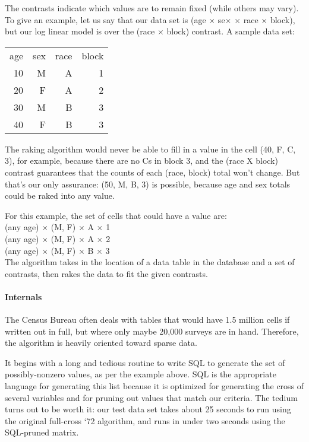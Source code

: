 \documentclass{article}
\begin{document}
The contrasts indicate which values are to remain fixed (while others may vary).
To give an example,
let us say that our data set is (age $\times$ se$\times$ $\times$ race $\times$ block), but
our log linear model is over the (race $\times$ block) contrast. A sample data set:

\begin{tabular}{rrrr}
age &sex &race &block\\
10  &M   &A    &1\\
20  &F   &A    &2\\
30  &M   &B    &3\\
40  &F   &B    &3
\end{tabular}

The raking algorithm would never be able to fill in a value in the cell (40, F, C, 3), for example, because
there are no Cs in block 3, and the (race X block) contrast guarantees that the counts of
each (race, block) total won't change. But that's our only assurance: (50, M, B, 3) is
possible, because age and sex totals could be raked into any value.

For this example, the set of cells that could have a value are:\\
(any age) $\times$ (M, F) $\times$ A $\times$ 1\\
(any age) $\times$ (M, F) $\times$ A $\times$ 2\\
(any age) $\times$ (M, F) $\times$ B $\times$ 3\\

The algorithm takes in the location of a data table in the database and a set of
contrasts, then rakes the data to fit the given contrasts.

\paragraph{Internals}
The Census Bureau often deals with tables that would have 1.5 million cells if written
out in full, but where only maybe 20,000 surveys are in hand. Therefore, the algorithm
is heavily oriented toward sparse data.

It begins with a long and tedious routine to write SQL to generate the set of
possibly-nonzero values, as per the example above. SQL is the appropriate language
for generating this list because it is optimized for generating the cross of several
variables and for pruning out values that match our criteria. The tedium turns out
to be worth it: our test data set takes about 25 seconds to run using the original
full-cross `72 algorithm, and runs in under two seconds using the SQL-pruned matrix.
\end{document}
